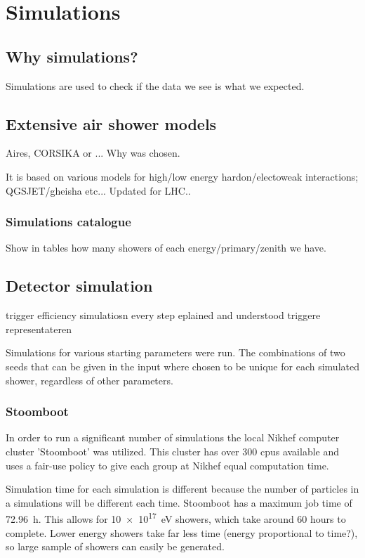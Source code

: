 \chapter{Simulations}
\label{ch:simulations}

\section{Why simulations?}

Simulations are used to check if the data we see is what we expected.



\section{Extensive air shower models}

Aires, CORSIKA or ...
Why was \corsika chosen.

It is based on various models for high/low energy hardon/electoweak
interactions; QGSJET/gheisha etc... Updated for LHC..


\subsection{Simulations catalogue}

Show in tables how many showers of each energy/primary/zenith we have.


\section{Detector simulation}

trigger efficiency
simulatiosn
every step eplained and understood
triggere representateren


Simulations for various starting parameters were run. The combinations
of two seeds that can be given in the input where chosen to be unique
for each simulated shower, regardless of other parameters.


\subsection{Stoomboot}

In order to run a significant number of simulations the local Nikhef
computer cluster 'Stoomboot' was utilized. This cluster has over 300
cpus available and uses a fair-use policy to give each group at Nikhef
equal computation time. 

Simulation time for each simulation is different because the number of
particles in a simulations will be different each time. Stoomboot has a
maximum job time of \SI{72.96}{\hour}. This allows for
\SI{10e17}{\electronvolt} showers, which take around 60 hours to
complete. Lower energy showers take far less time (energy proportional
to time?), so large sample of showers can easily be generated.


